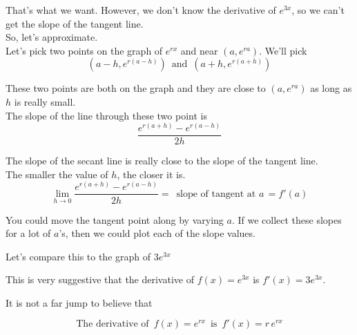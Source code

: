 \documentclass{ximera}
\begin{document}
That's what we want.  However, we don't know the derivative of $e^{3 x}$, so we can't get the slope of the tangent line. \\

So, let's approximate. \\



Let's pick two points on the graph of $e^{r x}$ and near $(a, e^{r a})$.  We'll pick
\[
(a-h, e^{r(a-h)}) \, \text{ and } \, (a+h, e^{r(a+h)})
\]

These two points are both on the graph and they are close to $(a, e^{r a})$ as long as $h$ is really small. \\

The slope of the line through these two point is 
\[
\frac{e^{r(a+h)} - e^{r(a-h)}}{2h}
\]





\begin{center}
\end{center}



The slope of the secant line is really close to the slope of the tangent line. \\

The smaller the value of $h$, the closer it is. \\


\[
\lim_{h \to 0} \frac{e^{r(a+h)} - e^{r(a-h)}}{2h} = \, \text{ slope of tangent at }a \, = f'(a)
\]


You could move the tangent point along by varying $a$.  If we collect these slopes for a lot of $a$'s, then we could plot each of the slope values.

Let's compare this to the graph of $3 e^{3 x}$










\begin{center}
\end{center}



This is very suggestive that the derivative of $f(x) = e^{3 x}$ is $f'(x) = 3 e^{3 x}$.

It is not a far jump to believe that 



\[
\text{The derivative of } \, f(x) = e^{r x} \, \text{ is } \, f'(x) = r \, e^{r x}
\]
\end{document}
